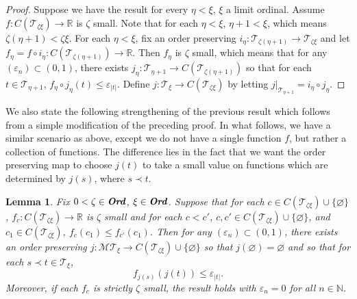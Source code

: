 \documentclass[12pt]{amsart}
\newtheorem{lemma}[theorem]{Lemma}
\theoremstyle{definition}
\newcommand{\ord}{\textbf{Ord}}
\newcommand{\rr}{\mathbb{R}}
\newcommand{\nn}{\mathbb{N}}
\newcommand{\mt}{\mathcal{MT}}
\newcommand{\ttt}{\mathcal{T}}
\begin{document}
\begin{proof}
Suppose we have the result for every $\eta<\xi$, $\xi$ a limit ordinal. Assume $f:C(\ttt_{\zeta\xi})\to \rr$ is $\zeta$ small.  Note that for each $\eta<\xi$, $\eta+1<\xi$, which means $\zeta(\eta+1)<\zeta\xi$.  For each $\eta<\xi$, fix an order preserving $i_\eta:\ttt_{\zeta(\eta+1)}\to \ttt_{\zeta\xi}$ and let $f_\eta=f\circ i_\eta:C(\ttt_{\zeta(\eta+1)})\to \rr$.  Then $f_\eta$ is $\zeta$ small, which means that for any $(\varepsilon_n)\subset (0,1)$, there exists $j_\eta:\ttt_{\eta+1}\to C(\ttt_{\zeta(\eta+1)})$ so that for each $t\in \ttt_{\eta+1}$, $f_\eta\circ j_\eta(t)\leqslant \varepsilon_{|t|}$.  Define $j:\ttt_\xi\to C(\ttt_{\zeta\xi})$ by letting $j|_{\ttt_{\eta+1}}=i_\eta\circ j_\eta$.  









\end{proof}


We also state the following strengthening of the previous result which follows from a simple modification of the preceding proof.  In what follows, we have a similar scenario as above, except we do not have a single function $f$, but rather a collection of functions. The difference lies in the fact that we want the order preserving map to choose $j(t)$ to take a small value on functions which are determined by $j(s)$, where $s\prec t$.  



\begin{lemma} Fix $0<\zeta\in \emph{\ord}$, $\xi\in \emph{\ord}$.  Suppose that for each $c\in C(\ttt_{\zeta\xi})\cup \{\varnothing\}$, $f_c:C(\ttt_{\zeta\xi})\to \rr$ is $\zeta$ small and for each $c<c'$, $c,c'\in C(\ttt_{\zeta\xi})\cup \{\varnothing\}$, and $c_1\in C(\ttt_{\zeta\xi})$, $f_c(c_1)\leqslant f_{c'}(c_1)$.  Then for any $(\varepsilon_n)\subset (0,1)$, there exists an order preserving $j:\mt_\xi\to C(\ttt_{\zeta\xi})\cup \{\varnothing\}$ so that $j(\varnothing)=\varnothing$ and so that for each $s\prec t\in \ttt_\xi$, $$f_{j(s)}(j(t))\leqslant \varepsilon_{|t|}.$$  
Moreover, if each $f_c$ is strictly $\zeta$ small, the result holds with $\varepsilon_n=0$ for all $n\in \nn$.  


\label{strong coloring}

\end{lemma}
\end{document}
